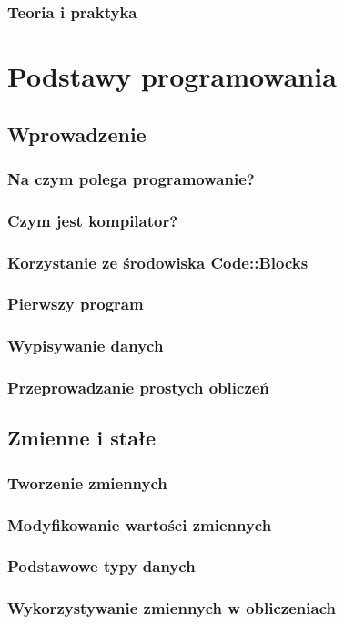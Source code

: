 \documentclass[11pt]{book}
\begin{document}
\section{Teoria i praktyka}


\part{Podstawy programowania}
\chapter{Wprowadzenie}
\section{Na czym polega programowanie?}
\section{Czym jest kompilator?}
\section{Korzystanie ze środowiska Code::Blocks}
\section{Pierwszy program}
\section{Wypisywanie danych}
\section{Przeprowadzanie prostych obliczeń}

\chapter{Zmienne i stałe}
\section{Tworzenie zmiennych}
\section{Modyfikowanie wartości zmiennych}
\section{Podstawowe typy danych}
\section{Wykorzystywanie zmiennych w obliczeniach}
\end{document}
